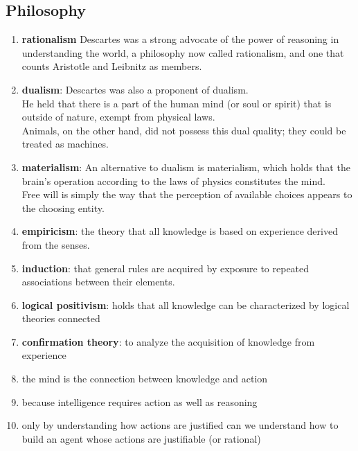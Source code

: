 \subsection{Philosophy}
\begin{enumerate}
    \item \textbf{rationalism} Descartes was a strong advocate of the power of reasoning in understanding the world, a philosophy now called rationalism, and one that counts Aristotle and Leibnitz as members. 

    \item \textbf{dualism}: Descartes was also a proponent of dualism.\\
    He held that there is a part of the human mind (or soul or spirit) that is outside of nature, exempt from physical laws.\\
    Animals, on the other hand, did not possess this dual quality; they could be treated as machines.

    \item \textbf{materialism}: An alternative to dualism is materialism, which holds that the brain’s operation according to the laws of physics constitutes the mind.\\
    Free will is simply the way that the perception of available choices appears to the choosing entity.

    \item \textbf{empiricism}: the theory that all knowledge is based on experience derived from the senses.

    \item \textbf{induction}: that general rules are acquired by exposure to repeated associations between their elements.

    \item \textbf{logical positivism}: holds that all knowledge can be characterized by logical theories connected

    \item \textbf{confirmation theory}: to analyze the acquisition of knowledge from experience

    \item the mind is the connection between knowledge and action

    \item because intelligence requires action as well as reasoning

    \item only by understanding how actions are justified can we understand how to build an agent whose actions are justifiable (or rational)
\end{enumerate}


